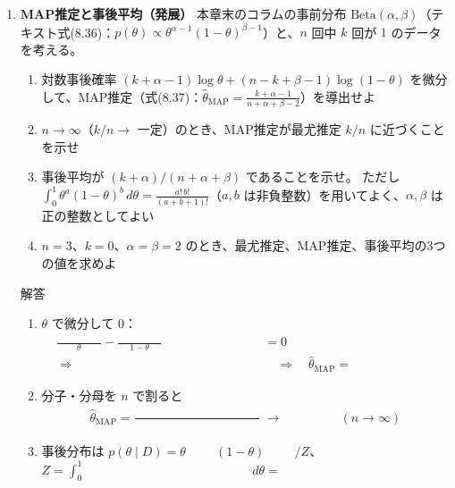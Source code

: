 \documentclass[a4paper,dvipdfmx]{jsarticle}
\newcommand{\提出期限}{2026年11月16日（月）}
\newcommand{\学籍番号}{0000000}
\newcommand{\氏名}{氏名を書く}
\newcommand{\提出日}{2026年11月16日}
\newenvironment{answer}{\begin{itembox}[l]{解答}}{\end{itembox}}
\begin{document}
\begin{enumerate}
  \item \textbf{MAP推定と事後平均（発展）}\quad
    本章末のコラムの事前分布 $\mathrm{Beta}(\alpha, \beta)$（テキスト式(8.36)：$p(\theta) \propto \theta^{\alpha - 1}(1 - \theta)^{\beta - 1}$）と、$n$ 回中 $k$ 回が $1$ のデータを考える。
    \begin{enumerate}
      \item 対数事後確率 $(k + \alpha - 1)\log\theta + (n - k + \beta - 1)\log(1 - \theta)$ を微分して、MAP推定（式(8.37)：$\hat{\theta}_{\mathrm{MAP}} = \frac{k + \alpha - 1}{n + \alpha + \beta - 2}$）を導出せよ
      \item $n \to \infty$（$k/n \to$ 一定）のとき、MAP推定が最尤推定 $k/n$ に近づくことを示せ
      \item 事後平均が $(k + \alpha)/(n + \alpha + \beta)$ であることを示せ。
        ただし $\int_0^1 \theta^a(1 - \theta)^b\,d\theta = \frac{a!\,b!}{(a + b + 1)!}$（$a, b$ は非負整数）を用いてよく、$\alpha, \beta$ は正の整数としてよい
      \item $n = 3$、$k = 0$、$\alpha = \beta = 2$ のとき、最尤推定、MAP推定、事後平均の3つの値を求めよ
    \end{enumerate}
    \begin{answer}
      \begin{enumerate}
        \item $\theta$ で微分して $0$：
          \begin{align*}
            \frac{\phantom{XXXXXX}}{\theta} - \frac{\phantom{XXXXXX}}{1 - \theta} &= 0 \\
            \Longrightarrow\quad \phantom{XXXXXXXXXXXXXXXX} &\quad\Longrightarrow\quad \hat{\theta}_{\mathrm{MAP}} = \phantom{XXXXXXXX}
          \end{align*}
        \item 分子・分母を $n$ で割ると
          \begin{equation*}
            \hat{\theta}_{\mathrm{MAP}} = \frac{\phantom{XXXXXXXXXXXX}}{\phantom{XXXXXXXXXXXX}} \;\longrightarrow\; \phantom{XXXX} \quad (n \to \infty)
          \end{equation*}
        \item 事後分布は $p(\theta \mid D) = \theta^{\phantom{XXXX}}(1 - \theta)^{\phantom{XXXX}} / Z$、$Z = \int_0^1 \phantom{XXXXXXXXXXXXXXXX}\,d\theta = \phantom{XXXXXXXXXXXXXX}$
          \vspace{2mm}


\end{enumerate}
\end{answer}
\end{enumerate}
\end{document}
